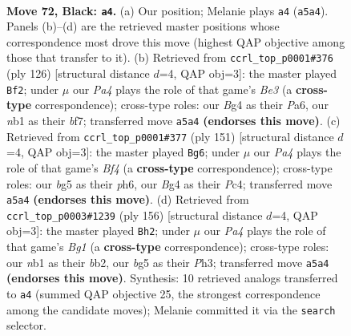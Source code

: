 \documentclass[11pt]{article}
\begin{document}
\clearpage

\begin{figure}[p]\centering
\begin{subfigure}{0.46\textwidth}\centering
\resizebox{\linewidth}{!}{%
\newchessgame
\chessboard[
  setfen={8/8/8/p5B1/2pk2b1/8/5K2/1N6 b - - 13 72},
  showmover=false,
  pgfstyle=straightmove, color=movearrow, markmove={a5-a4}
]}
\caption{}
\end{subfigure}\hfill
\begin{subfigure}{0.46\textwidth}\centering
\resizebox{\linewidth}{!}{%
\newchessgame
\chessboard[
  setfen={2k5/4Pb2/P2K4/8/8/4B3/8/8 w - - 17 64},
  showmover=false,
  pgfstyle=straightmove, color=movearrow, markmove={e3-f2}
]}
\caption{}
\end{subfigure}
\\[4pt]
\begin{subfigure}{0.46\textwidth}\centering
\resizebox{\linewidth}{!}{%
\newchessgame
\chessboard[
  setfen={8/8/7P/5b2/2p5/5k2/4p3/4B1K1 b - - 5 76},
  showmover=false,
  pgfstyle=straightmove, color=movearrow, markmove={f5-g6}
]}
\caption{}
\end{subfigure}\hfill
\begin{subfigure}{0.46\textwidth}\centering
\resizebox{\linewidth}{!}{%
\newchessgame
\chessboard[
  setfen={8/5k2/7P/7K/8/7P/1b6/6B1 w - - 25 79},
  showmover=false,
  pgfstyle=straightmove, color=movearrow, markmove={g1-h2}
]}
\caption{}
\end{subfigure}
\caption{\textbf{Move 72, Black: \texttt{a4}.} (a) Our position; Melanie plays \texttt{a4} (\texttt{a5a4}). Panels (b)--(d) are the retrieved master positions whose correspondence most drove this move (highest QAP objective among those that transfer to it). (b) Retrieved from \texttt{ccrl\_top\_p0001\#376} (ply 126) [structural distance $d$=4, QAP obj=3]: the master played \texttt{Bf2}; under $\mu$ our \emph{Pa4} plays the role of that game's \emph{Be3} (a \textbf{cross-type} correspondence); cross-type roles: our \emph{B}g4 as their \emph{P}a6, our \emph{n}b1 as their \emph{b}f7; transferred move \texttt{a5a4} \textbf{(endorses this move)}. (c) Retrieved from \texttt{ccrl\_top\_p0001\#377} (ply 151) [structural distance $d$=4, QAP obj=3]: the master played \texttt{Bg6}; under $\mu$ our \emph{Pa4} plays the role of that game's \emph{Bf4} (a \textbf{cross-type} correspondence); cross-type roles: our \emph{b}g5 as their \emph{p}h6, our \emph{B}g4 as their \emph{P}c4; transferred move \texttt{a5a4} \textbf{(endorses this move)}. (d) Retrieved from \texttt{ccrl\_top\_p0003\#1239} (ply 156) [structural distance $d$=4, QAP obj=3]: the master played \texttt{Bh2}; under $\mu$ our \emph{Pa4} plays the role of that game's \emph{Bg1} (a \textbf{cross-type} correspondence); cross-type roles: our \emph{n}b1 as their \emph{b}b2, our \emph{b}g5 as their \emph{P}h3; transferred move \texttt{a5a4} \textbf{(endorses this move)}. Synthesis: 10 retrieved analogs transferred to \texttt{a4} (summed QAP objective 25, the strongest correspondence among the candidate moves); Melanie committed it via the \texttt{search} selector.}
\label{fig:thought-m143}
\end{figure}
\end{document}
